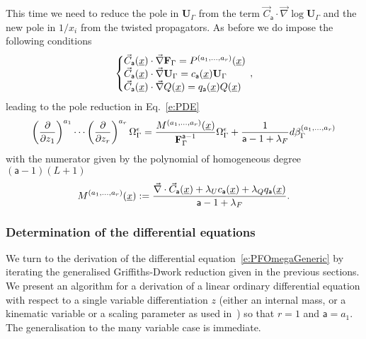 \documentclass[a4paper,12pt]{article}
\numberwithin{equation}{section}
\numberwithin{figure}{section}
\begin{document}
%
This time we need to reduce the pole in $\mathbf{U}_\Gamma$ from  the term $\vec
    C_{\mathsf{a}}\cdot\vec\nabla\log\mathbf{U}_\Gamma$ and the new
    pole in $1/x_i$ from the twisted propagators.
    As before we do impose the following conditions
\begin{equation}\label{e:sysCFUAnReg}
   \left\{\begin{array}{@{}l@{}}
\vec C_{\mathsf{a}} (\underline x) \cdot \vec \nabla \textbf{F}_\Gamma
            =    P^{(a_1,\dots,a_r)}(\underline x)\\
\vec C_{\mathsf{a}} (\underline x)\cdot\vec \nabla\textbf{U}_\Gamma=
            c_{{\mathsf{a}}}(\underline x) \textbf{U}_\Gamma \\
            \vec C_{\mathsf{a}} (\underline x)\cdot\vec \nabla
            Q(\underline x)=
            q_{{\mathsf{a}}}(\underline x) Q(\underline x)
  \end{array}\right.\,,
\end{equation}
leading to the pole  reduction in Eq.~\eqref{e:PDE} 
% 
\begin{equation}\label{e:RedFinalAnReg}
\left(\partial\over \partial z_1\right)^{a_1}\cdots\left(\partial
  \over\partial z_r\right)^{a_r} \Omega_\Gamma^\epsilon={
M^{(a_1,\dots,a_r)}
     (\underline x)
\over \textbf{F}_\Gamma^{\mathsf{a}-1}}\Omega_\Gamma^\epsilon
+{  1\over \mathsf{a}-1+\lambda_F} d\beta_\Gamma^{(a_1,\dots,a_r)}
\end{equation}
with the numerator given by the polynomial of homogeneous degree $(\mathsf{a}-1)(L+1)$
\begin{equation}
  \label{e:MfinalAnReg}
  M^{(a_1,\dots,a_r)}(\underline x):={
\vec\nabla \cdot \vec C_{\mathsf{a}}
     (\underline x)
+  \lambda_U
    c_{\mathsf{a}}(\underline x)+\lambda_Q q_{\mathsf{a}}(\underline x)\over
    \mathsf{a}-1+\lambda_F}.
\end{equation}
%


\subsubsection{Determination of the differential equations}
\label{sec:deriv-diff-equat}


We turn to the derivation of the differential
equation~\eqref{e:PFOmegaGeneric}  by iterating the generalised
Griffiths-Dwork reduction given in the previous sections. We present an algorithm for a derivation of
a linear ordinary differential equation with respect to a single
variable differentiation $z$ (either an internal mass, or a kinematic
variable or a scaling parameter as used
in~\cite{Lairez:2022zkj,Doran:2023yzu}) so that $r=1$ and
$\mathsf{a}=a_1$. The generalisation to the many variable  case is immediate.
\end{document}
